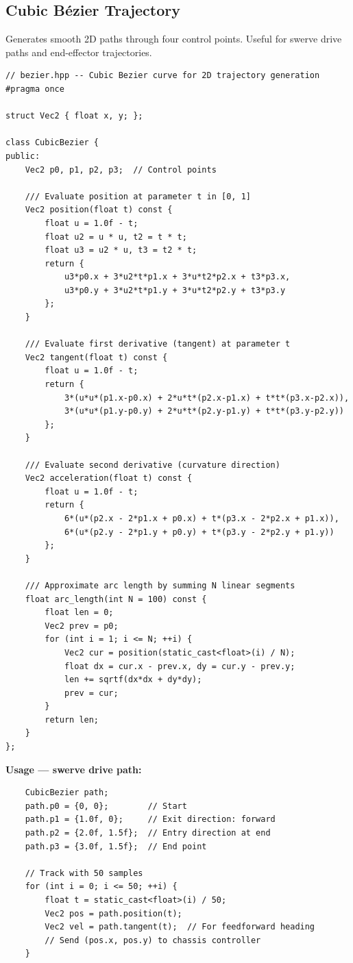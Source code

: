\subsection{Cubic B\'{e}zier Trajectory}

Generates smooth 2D paths through four control points. Useful for swerve drive paths and end-effector trajectories.

\begin{verbatim}
// bezier.hpp -- Cubic Bezier curve for 2D trajectory generation
#pragma once

struct Vec2 { float x, y; };

class CubicBezier {
public:
    Vec2 p0, p1, p2, p3;  // Control points

    /// Evaluate position at parameter t in [0, 1]
    Vec2 position(float t) const {
        float u = 1.0f - t;
        float u2 = u * u, t2 = t * t;
        float u3 = u2 * u, t3 = t2 * t;
        return {
            u3*p0.x + 3*u2*t*p1.x + 3*u*t2*p2.x + t3*p3.x,
            u3*p0.y + 3*u2*t*p1.y + 3*u*t2*p2.y + t3*p3.y
        };
    }

    /// Evaluate first derivative (tangent) at parameter t
    Vec2 tangent(float t) const {
        float u = 1.0f - t;
        return {
            3*(u*u*(p1.x-p0.x) + 2*u*t*(p2.x-p1.x) + t*t*(p3.x-p2.x)),
            3*(u*u*(p1.y-p0.y) + 2*u*t*(p2.y-p1.y) + t*t*(p3.y-p2.y))
        };
    }

    /// Evaluate second derivative (curvature direction)
    Vec2 acceleration(float t) const {
        float u = 1.0f - t;
        return {
            6*(u*(p2.x - 2*p1.x + p0.x) + t*(p3.x - 2*p2.x + p1.x)),
            6*(u*(p2.y - 2*p1.y + p0.y) + t*(p3.y - 2*p2.y + p1.y))
        };
    }

    /// Approximate arc length by summing N linear segments
    float arc_length(int N = 100) const {
        float len = 0;
        Vec2 prev = p0;
        for (int i = 1; i <= N; ++i) {
            Vec2 cur = position(static_cast<float>(i) / N);
            float dx = cur.x - prev.x, dy = cur.y - prev.y;
            len += sqrtf(dx*dx + dy*dy);
            prev = cur;
        }
        return len;
    }
};
\end{verbatim}

\textbf{Usage --- swerve drive path:}
\begin{verbatim}
    CubicBezier path;
    path.p0 = {0, 0};        // Start
    path.p1 = {1.0f, 0};     // Exit direction: forward
    path.p2 = {2.0f, 1.5f};  // Entry direction at end
    path.p3 = {3.0f, 1.5f};  // End point

    // Track with 50 samples
    for (int i = 0; i <= 50; ++i) {
        float t = static_cast<float>(i) / 50;
        Vec2 pos = path.position(t);
        Vec2 vel = path.tangent(t);  // For feedforward heading
        // Send (pos.x, pos.y) to chassis controller
    }
\end{verbatim}

